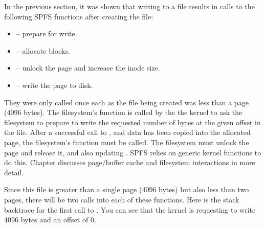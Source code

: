 \noindent
In the previous section, it was shown that writing to a file results in calls to the following SPFS functions after creating the file:

\begin{itemize}
	\item {} -- prepare for write.
	\item {} -- allocate blocks.
	\item {} -- unlock the page and increase the inode size.
	\item {} -- write the page to disk.
\end{itemize}

\noindent
They were only called once each as the file being created was less than a page (4096 bytes). The filesystem's  function is called by the the kernel to ask the filesystem to prepare to write the requested number of bytes at the given offset in the file. After a successful call to , and data has been copied into the allocated page, the filesystem's  function must be called. The filesystem must unlock the page and release it, and also updating . SPFS relies on generic kernel functions to do this. Chapter \label{vfs} discusses page/buffer cache and filesystem interactions in more detail.

Since this file is greater than a single page (4096 bytes) but also less than two pages, there will be two calls into each of these functions. Here is the stack backtrace for the first call to . You can see that the kernel is requesting to write 4096 bytes and an offset of 0.

